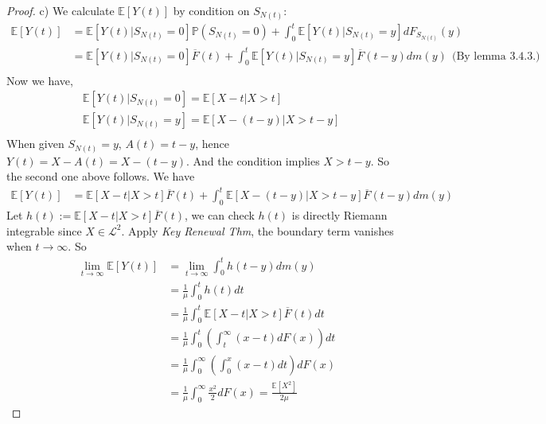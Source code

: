 \documentclass[a4paper, 10pt]{article}
\theoremstyle{definition}
\theoremstyle{hSol}
\begin{document}
\begin{proof} c) We calculate $\mathbb{E}\left[Y(t)\right]$ by condition on $S_{N(t)}$:
\begin{equation}
  \begin{split}
    \mathbb{E}\left[Y(t)\right] &= \mathbb{E}\left[Y(t)|S_{N(t)}=0\right]\mathbb{P}\left(S_{N(t)}=0\right) + \int_0^t \mathbb{E}\left[Y(t)|S_{N(t)}=y\right]dF_{S_{N(t)}}(y) \\
    &= \mathbb{E}\left[Y(t)|S_{N(t)}=0\right]\overline{F}(t) + \int_0^t \mathbb{E}\left[Y(t)|S_{N(t)}=y\right]\overline{F}(t-y)dm(y)~~\text{(By lemma 3.4.3.)} \\
  \end{split}
\end{equation}
Now we have,
\begin{equation}
  \begin{split}
    & \mathbb{E}\left[Y(t)|S_{N(t)}=0\right] = \mathbb{E}\left[X-t|X>t\right] \\
    & \mathbb{E}\left[Y(t)|S_{N(t)}=y\right] = \mathbb{E}\left[X-(t-y)|X>t-y\right] \\
  \end{split}
\end{equation}
When given $S_{N(t)}=y$, $A(t)=t-y$, hence $Y(t)=X-A(t)=X-(t-y)$. And the condition implies $X>t-y$. So the second one above follows. We have
\begin{equation}
  \begin{split}
    \mathbb{E}\left[Y(t)\right] &= \mathbb{E}\left[X-t|X>t\right]\overline{F}(t) + \int_0^t \mathbb{E}\left[X-(t-y)|X>t-y\right]\overline{F}(t-y)dm(y)
  \end{split}
\end{equation}
Let $h(t):=\mathbb{E}\left[X-t|X>t\right]\overline{F}(t)$, we can check $h(t)$ is directly Riemann integrable since $X\in \mathcal{L}^2$. Apply \textit{Key Renewal Thm}, the boundary term vanishes when $t\to \infty$. So
\begin{equation}
  \begin{split}
    \lim\limits_{t\rightarrow\infty}\mathbb{E}\left[Y(t)\right] &=  \lim\limits_{t\rightarrow\infty} \int_0^t h(t-y)dm(y)\\
    &= \frac{1}{\mu} \int_0^t h(t)dt \\
    &= \frac{1}{\mu} \int_0^t \mathbb{E}\left[X-t|X>t\right]\overline{F}(t)dt \\
    &= \frac{1}{\mu} \int_0^t \left(\int_t^{\infty} (x-t)dF(x)\right)dt \\
    &= \frac{1}{\mu} \int_0^{\infty} \left(\int_0^x (x-t)dt\right)dF(x) \\
    &= \frac{1}{\mu} \int_0^{\infty} \frac{x^2}{2}dF(x) = \frac{\mathbb{E}\left[X^2\right]}{2\mu}
  \end{split}
\end{equation}
\end{proof}
\end{document}
